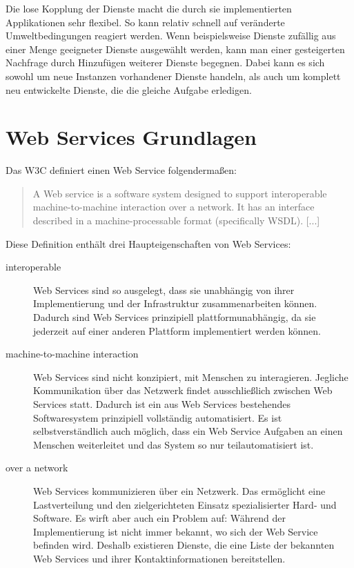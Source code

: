 \documentclass[runningheads]{llncs}
\newcommand{\germanquote}[1]{\glqq{}#1\grqq{}}
\begin{document}
    Die lose Kopplung der Dienste macht die durch sie implementierten Applikationen sehr flexibel.
    So kann relativ schnell auf veränderte Umweltbedingungen reagiert werden. Wenn beispielsweise
    Dienste zufällig aus einer Menge geeigneter Dienste ausgewählt werden, kann man einer
    gesteigerten Nachfrage durch Hinzufügen weiterer Dienste begegnen. Dabei kann es sich sowohl um
    neue Instanzen vorhandener Dienste handeln, als auch um komplett neu entwickelte Dienste, die
    die gleiche Aufgabe erledigen.


  \label{ws}
  \section{Web Services Grundlagen}
  \nocite{wk_ws}
    Das W3C definiert einen \germanquote{Web Service} folgendermaßen:
    \begin{quote}
      A Web service is a software system designed to support interoperable machine-to-machine interaction
      over a network. It has an interface described in a machine-processable format (specifically
      WSDL). [...]\cite{w3c_wsgloss_ws}
    \end{quote}

    Diese Definition enthält drei Haupteigenschaften von Web Services:
    \begin{description}
      \item[interoperable]
        Web Services sind so ausgelegt, dass sie unabhängig von ihrer Implementierung und der
        Infrastruktur zusammenarbeiten können. Dadurch sind Web Services prinzipiell
        plattformunabhängig, da sie jederzeit auf einer anderen Plattform implementiert werden
        können.
      \item[machine-to-machine interaction]
        Web Services sind nicht konzipiert, mit Menschen zu interagieren. Jegliche Kommunikation
        über das Netzwerk findet ausschließlich zwischen Web Services statt. Dadurch ist ein aus
        Web Services bestehendes Softwaresystem prinzipiell vollständig automatisiert. Es ist
        selbstverständlich auch möglich, dass ein Web Service Aufgaben an einen Menschen
        weiterleitet und das System so nur teilautomatisiert ist.
      \item[over a network]
        Web Services kommunizieren über ein Netzwerk. Das ermöglicht eine Lastverteilung und den
        zielgerichteten Einsatz spezialisierter Hard- und Software. Es wirft aber auch ein Problem
        auf: Während der Implementierung ist nicht immer bekannt, wo sich der Web Service befinden
        wird. Deshalb existieren Dienste, die eine Liste der bekannten Web Services und ihrer
        Kontaktinformationen bereitstellen.
    \end{description}
\end{document}
